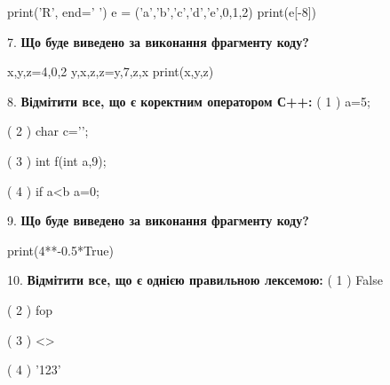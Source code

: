 \documentclass[11pt]{article}
\begin{document}
print('R', end=' ')
e = ('a','b','c','d','e',0,1,2)
print(e[-8])

\par\vspace{5mm}

7. \textbf{Що буде виведено за виконання фрагменту коду?}

x,y,z=4,0,2
y,x,z,z=y,7,z,x
print(x,y,z)
\par\vspace{5mm}

8. %
\textbf{Відмітити все, що є коректним оператором С++:}
( 1 ) {a=5;}

( 2 ) char c='\n';

( 3 ) int f(int a,9);

( 4 ) if a<b a=0;
\par\vspace{5mm}

9. \textbf{Що буде виведено за виконання фрагменту коду?}

print(4**-0.5*True)
\par\vspace{5mm}

10. %
\textbf{Відмітити все, що є однією правильною лексемою:}
( 1 ) False

( 2 ) fop

( 3 ) <>

( 4 ) '123'
\par\vspace{5mm}

\newpage
\end{document}
